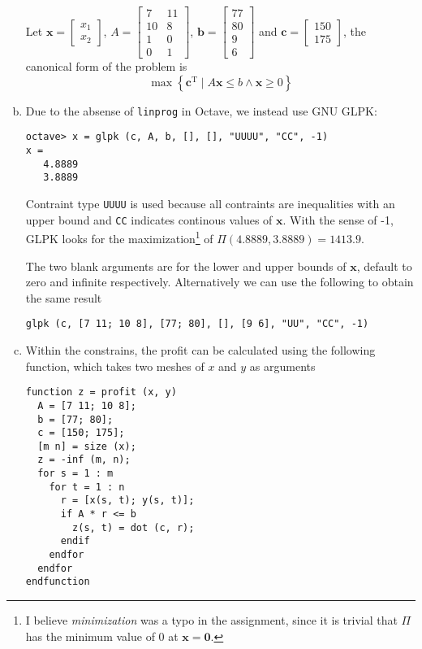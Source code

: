 \documentclass[a4paper,12pt]{article}
\begin{document}
\begin{enumerate}[(a)]
    Let $\mathbf x = \begin{bmatrix}
      x_1\\ x_2
    \end{bmatrix}$, $A = \begin{bmatrix}
      7 & 11\\
      10 & 8\\
      1 & 0\\
      0 & 1
    \end{bmatrix}$, $\mathbf b = \begin{bmatrix}
      77\\ 80\\ 9\\ 6
    \end{bmatrix}$ and $\mathbf c = \begin{bmatrix}
      150\\ 175
    \end{bmatrix}$, the canonical form of the problem is
    \[\max\left\{\mathbf c^\mathrm T
                 \mid A\mathbf x\le b\land\mathbf x\ge 0\right\}\]
  \item Due to the absense of \verb|linprog| in Octave, we instead use GNU GLPK:
\begin{verbatim}
octave> x = glpk (c, A, b, [], [], "UUUU", "CC", -1)
x =
   4.8889
   3.8889
\end{verbatim}
    Contraint type \verb|UUUU| is used because all contraints are inequalities
    with an upper bound and \verb|CC| indicates continous values of $\mathbf x$.
    With the sense of -1, GLPK looks for the maximization\footnote{I believe
    \emph{minimization} was a typo in the assignment, since it is trivial that
    $\Pi$ has the minimum value of 0 at $\mathbf x = \mathbf 0$.} of
    $\Pi(4.8889, 3.8889) = 1413.9$.

    The two blank arguments are for the lower and upper bounds of $\mathbf x$,
    default to zero and infinite respectively.  Alternatively we can use
    the following to obtain the same result
\begin{verbatim}
glpk (c, [7 11; 10 8], [77; 80], [], [9 6], "UU", "CC", -1)
\end{verbatim}

  \item Within the constrains, the profit can be calculated using the following
    function, which takes two meshes of $x$ and $y$ as arguments
\begin{verbatim}
function z = profit (x, y)
  A = [7 11; 10 8];
  b = [77; 80];
  c = [150; 175];
  [m n] = size (x);
  z = -inf (m, n);
  for s = 1 : m
    for t = 1 : n
      r = [x(s, t); y(s, t)];
      if A * r <= b
        z(s, t) = dot (c, r);
      endif
    endfor
  endfor
endfunction
\end{verbatim}


\end{enumerate}
\end{document}

